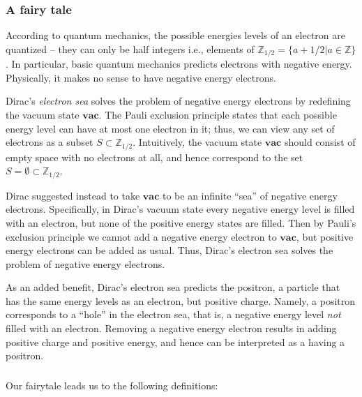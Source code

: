 \documentclass{amsart}[12pt]
\theoremstyle{definition}
\newcommand{\Z}{\mathbb{Z}}
\newcommand{\vac}{\mathbf{vac}}
\begin{document}
\subsubsection{A fairy tale}
According to quantum mechanics, the possible energies levels of an electron are quantized -- they can only be half integers i.e., elements of $\Z_{1/2}=\{a+1/2|a\in\Z\}$.  In particular, basic quantum mechanics predicts electrons with negative energy.  Physically, it makes no sense to have negative energy electrons.


Dirac's \emph{electron sea} solves the problem of negative energy electrons by redefining the vacuum state $\vac$.  The Pauli exclusion principle states that each possible energy level can have at most one electron in it; thus, we can view any set of electrons as a subset $S\subset \Z_{1/2}$.  Intuitively, the vacuum state $\vac$ should consist of empty space with no electrons at all, and hence correspond to the set $S=\emptyset\subset\Z_{1/2}$.

Dirac suggested instead to take $\vac$ to be an
infinite ``sea'' of negative energy electrons.   Specifically, in Dirac's vacuum state every negative energy level is filled with an electron, but none of the positive energy states are filled. Then by Pauli's
exclusion principle we cannot add a negative energy electron
to $\vac$, but positive energy electrons can be added as usual.  Thus, Dirac's electron sea solves the problem of negative energy electrons.

As an added benefit, Dirac's electron sea predicts the positron, a particle
that has the same energy levels as an electron, but positive charge.  Namely, a positron corresponds to a ``hole'' in the electron sea, that is, a negative
energy level \emph{not} filled with an electron.  Removing a negative energy electron results in adding positive charge and positive energy, and hence can be interpreted as a having a positron.

\subsubsection{} Our fairytale leads us to the following definitions:
\end{document}
